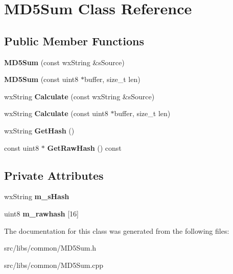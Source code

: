 \section{MD5Sum Class Reference}
\label{classMD5Sum}
\subsection*{Public Member Functions}
\begin{DoxyCompactItemize}
\item 
{\bfseries MD5Sum} (const wxString \&sSource)\label{classMD5Sum_a36a0c49a04a210d9c65eeb0f162da458}

\item 
{\bfseries MD5Sum} (const uint8 $\ast$buffer, size\_\-t len)\label{classMD5Sum_ab5fdab063a25f678eae18f6dfd13eb3b}

\item 
wxString {\bfseries Calculate} (const wxString \&sSource)\label{classMD5Sum_a3bb716733693c11a04d2db1985784668}

\item 
wxString {\bfseries Calculate} (const uint8 $\ast$buffer, size\_\-t len)\label{classMD5Sum_ab3a7927f09eae83593662e560b99b4a1}

\item 
wxString {\bfseries GetHash} ()\label{classMD5Sum_a027e3786a1bd79249766fc47ed0119e7}

\item 
const uint8 $\ast$ {\bfseries GetRawHash} () const \label{classMD5Sum_aade33e1413c3efabe0435a0473fe135b}

\end{DoxyCompactItemize}
\subsection*{Private Attributes}
\begin{DoxyCompactItemize}
\item 
wxString {\bfseries m\_\-sHash}\label{classMD5Sum_abc4c27c647ba902a8f5be5f73776d093}

\item 
uint8 {\bfseries m\_\-rawhash} [16]\label{classMD5Sum_af79d8644699aaf8d7906ec9693a1f188}

\end{DoxyCompactItemize}


The documentation for this class was generated from the following files:\begin{DoxyCompactItemize}
\item 
src/libs/common/MD5Sum.h\item 
src/libs/common/MD5Sum.cpp\end{DoxyCompactItemize}
